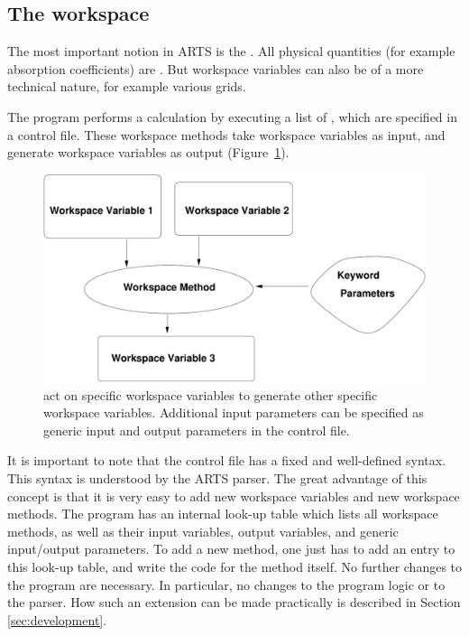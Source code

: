 \subsection{The workspace}
%
The most important notion in ARTS is the . All
physical quantities (for example absorption coefficients) are
. But workspace variables can also be of
a more technical nature, for example various grids. 

The program performs a calculation by executing a list of
, which are specified in a control
file. These workspace methods take workspace variables as input, and
generate workspace variables as output (Figure~\ref{fig:method}).

\begin{figure}
  \begin{center}
    \includegraphics[width=\hsize,draft=false]{method}
    \caption{ act on specific
      workspace variables to generate other specific workspace
      variables. Additional input parameters can be specified as
      generic input and output parameters in the control file.}
    \label{fig:method}
  \end{center}
\end{figure}

It is important to note that the control file has a fixed and
well-defined syntax. This syntax is understood by the ARTS parser.
The great advantage of this concept is that it is very easy to add
new workspace variables and new workspace methods. The program has
an internal look-up table which lists all workspace methods, as well
as their input variables, output variables, and generic input/output
parameters. To add a new method, one just has to add an entry to
this look-up table, and write the code for the method itself. No
further changes to the program are necessary. In particular, no
changes to the program logic or to the parser. How such an extension
can be made practically is described in Section \ref{sec:development}.



